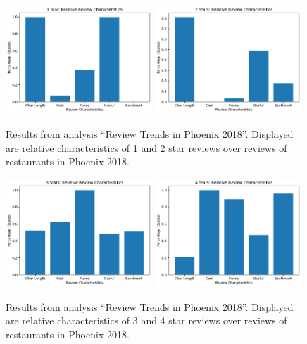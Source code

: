 \begin{figure}[h]
    \centering
    \includegraphics[width=0.49\textwidth]{img/phoenix2018/1Star.pdf}
    \includegraphics[width=0.49\textwidth]{img/phoenix2018/2Stars.pdf}
    \caption{Results from analysis ``Review Trends in Phoenix 2018''. Displayed are relative characteristics of 1 and 2 star reviews over reviews of restaurants in Phoenix 2018.}
    \label{fig:12star}
\end{figure}


\begin{figure}[h]
    \centering
    
    \includegraphics[width=0.49\textwidth]{img/phoenix2018/3Stars.pdf}
    \includegraphics[width=0.49\textwidth]{img/phoenix2018/4Stars.pdf}
    \caption{Results from analysis ``Review Trends in Phoenix 2018''. Displayed are relative characteristics of 3 and 4 star reviews over reviews of restaurants in Phoenix 2018.}
    \label{fig:34star}
\end{figure}

